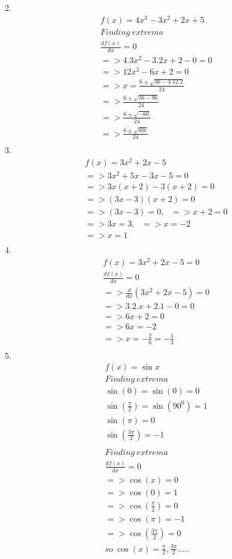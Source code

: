 	2.
	\begin{align}
		f(x) = 4x^3-3x^2+2x+5 \\
		Finding \ extrema \\
		\frac{df(x)}{dx} = 0 \\
		=> 4.3x^2-3.2x+2-0=0 \\
		=> 12x^2 - 6x + 2 = 0 \\
		=> x = \frac{6\pm \sqrt{36-4.12.2}}{24} \\
		=> \frac{6\pm \sqrt{36-96}}{24} \\
		=> \frac{6\pm \sqrt{-60}}{24} \\
		=> \frac{6\pm \sqrt{60 i}}{24} \\
	\end{align}
	3.
	\begin{align}
		f(x) = 3x^2+2x-5 \\
		=> 3x^2+5x-3x-5 = 0 \\
		=> 3x(x+2)-3(x+2) = 0 \\
		=> (3x-3)(x+2) = 0 \\
		=> (3x-3) =0, \ \ \ => x+2=0 \\
		=> 3x = 3, \ \ \ => x= -2 \\
		=> x = 1 \\
	\end{align}
	4.
	\begin{align}
		f(x) = 3x^2+2x-5 = 0 \\
		\frac{df(x)}{dx} = 0 \\
		=> \frac{d}{dx}(3x^2+2x-5) =0 \\
		=> 3.2.x+2.1-0 = 0 \\
		=> 6x+2 = 0 \\
		=> 6x = -2 \\
		=> x = - \frac{2}{6} = - \frac{1}{3} \\
	\end{align}
	5.
	\begin{align}
		f(x) = \sin x \\
		Finding \ extrema \\
		\sin(0) = \sin(0) = 0 \\
		\sin(\frac{\pi}{2})	= \sin(90^0) = 1 \\
		\sin(\pi) = 0 \\
		\sin(\frac{3\pi}{2}) = -1 \\
		\\
		Finding \ extrema \\
		\frac{df(x)}{dx} = 0 \\
		=>\cos(x) = 0 \\
		=>\cos(0)= 1 \\
		=>\cos(\frac{\pi}{2}) = 0 \\
		=>\cos(\pi) = -1 \\
		=>\cos(\frac{3\pi}{2}) = 0 \\
		so\ \cos(x) = \frac{\pi}{2} , \frac{3\pi}{2}.....\\
	\end{align}
